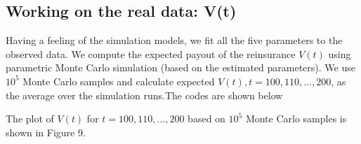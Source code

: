 \documentclass[11pt,]{article}
\newenvironment{Shaded}{\begin{snugshade}}{\end{snugshade}}
\newcommand{\CommentTok}[1]{\textcolor[rgb]{0.56,0.35,0.01}{\textit{#1}}}
\newcommand{\ControlFlowTok}[1]{\textcolor[rgb]{0.13,0.29,0.53}{\textbf{#1}}}
\newcommand{\DecValTok}[1]{\textcolor[rgb]{0.00,0.00,0.81}{#1}}
\newcommand{\KeywordTok}[1]{\textcolor[rgb]{0.13,0.29,0.53}{\textbf{#1}}}
\newcommand{\NormalTok}[1]{#1}
\newcommand{\OperatorTok}[1]{\textcolor[rgb]{0.81,0.36,0.00}{\textbf{#1}}}
\newcommand{\StringTok}[1]{\textcolor[rgb]{0.31,0.60,0.02}{#1}}
\begin{document}
\hypertarget{working-on-the-real-data-vt}{%
\subsection{Working on the real data:
V(t)}\label{working-on-the-real-data-vt}}

Having a feeling of the simulation models, we fit all the five
parameters to the observed data. We compute the expected payout of the
reinsurance \(V(t)\) using parametric Monte Carlo simulation (based on
the estimated parameters). We use \(10^5\) Monte Carlo samples and
calculate expected \(V(t), t=100,110,…,200\), as the average over the
simulation runs.The codes are shown below

\begin{Shaded}
\end{Shaded}

The plot of \(V(t)\) for \(t=100,110,…,200\) based on \(10^5\) Monte
Carlo samples is shown in Figure 9.
\end{document}

